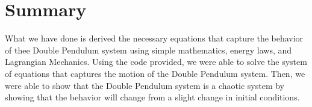 \section{Summary}
What we have done is derived the necessary equations that capture the behavior of thee Double Pendulum system using simple mathematics, energy laws, and Lagrangian Mechanics. Using the code provided, we were able to solve the system of equations that captures the motion of the Double Pendulum system. Then, we were able to show that the Double Pendulum system is a chaotic system by showing that the behavior will change from a slight change in initial conditions. 

